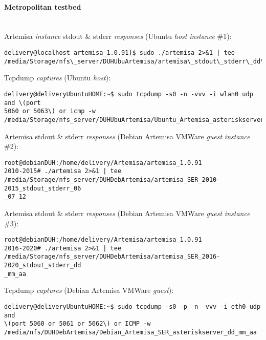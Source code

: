 \documentclass[a4paper,12pt]{report}
\newenvironment{myscriptlisting}
{\begin{list}{}{\setlength{\leftmargin}{1em}}\item\scriptsize\bfseries}
{\end{list}}
\begin{document}
\paragraph{Metropolitan testbed \\ \\} 

Artemisa \emph{instance} \ac{stdout} \& \ac{stderr} \emph{responses} (Ubuntu \emph{host}
\emph{instance} \#1):
\begin{myscriptlisting}   
  \begin{verbatim}
delivery@localhost artemisa_1.0.91]$ sudo ./artemisa 2>&1 | tee
/media/Storage/nfs\_server/DUHUbuArtemisa/artemisa\_stdout\_stderr\_dd\_mm\_aa
  \end{verbatim}
\end{myscriptlisting}

Tcpdump \emph{captures} (Ubuntu \emph{host}):
\begin{myscriptlisting}   
  \begin{verbatim}
delivery@deliveryUbuntuHOME:~$ sudo tcpdump -s0 -n -vvv -i wlan0 udp and \(port
5060 or 5063\) or icmp -w
/media/Storage/nfs_server/DUHUbuArtemisa/Ubuntu_Artemisa_asteriskserver_dd_mm_aa
  \end{verbatim}
\end{myscriptlisting}

Artemisa \ac{stdout} \& \ac{stderr} \emph{responses} (Debian Artemisa
VMWare \emph{guest} \emph{instance} \#2):
\begin{myscriptlisting}   
  \begin{verbatim}
root@debianDUH:/home/delivery/Artemisa/artemisa_1.0.91
2010-2015# ./artemisa 2>&1 | tee
/media/Storage/nfs_server/DUHDebArtemisa/artemisa_SER_2010-2015_stdout_stderr_06
_07_12
  \end{verbatim}
\end{myscriptlisting}

Artemisa \ac{stdout} \& \ac{stderr} \emph{responses} (Debian Artemisa VMWare
\emph{guest} \emph{instance} \#3):
\begin{myscriptlisting}   
  \begin{verbatim}
root@debianDUH:/home/delivery/Artemisa/artemisa_1.0.91
2016-2020# ./artemisa 2>&1 | tee
/media/Storage/nfs_server/DUHDebArtemisa/artemisa_SER_2016-2020_stdout_stderr_dd
_mm_aa
  \end{verbatim}
\end{myscriptlisting}

Tcpdump \emph{captures} (Debian Artemisa VMWare \emph{guest}):
\begin{myscriptlisting}   
  \begin{verbatim}
delivery@deliveryUbuntuHOME:~$ sudo tcpdump -s0 -p -n -vvv -i eth0 udp and
\(port 5060 or 5061 or 5062\) or ICMP -w
/media/nfs/DUHDebArtemisa/Debian_Artemisa_SER_asteriskserver_dd_mm_aa
  \end{verbatim}
\end{myscriptlisting}
\end{document}
